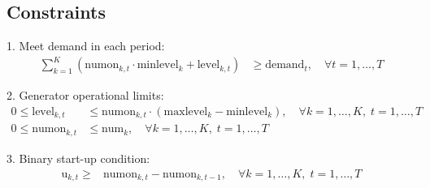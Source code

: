 \documentclass{article}
\begin{document}
\subsection*{Constraints}

1. Meet demand in each period:
\begin{align*}
\sum_{k=1}^{K} \left( \text{numon}_{k,t} \cdot \text{minlevel}_{k} + \text{level}_{k,t} \right) & \geq \text{demand}_{t}, \quad \forall t=1,\dots,T
\end{align*}

2. Generator operational limits:
\begin{align*}
0 \leq \text{level}_{k,t} & \leq \text{numon}_{k,t} \cdot (\text{maxlevel}_{k} - \text{minlevel}_{k}), \quad \forall k=1,\dots,K, \; t=1,\dots,T \\
0 \leq \text{numon}_{k,t} & \leq \text{num}_{k}, \quad \forall k=1,\dots,K, \; t=1,\dots,T
\end{align*}

3. Binary start-up condition:
\begin{align*}
\text{u}_{k,t} \geq & \text{numon}_{k,t} - \text{numon}_{k,t-1}, \quad \forall k=1,\dots,K, \; t=1,\dots,T
\end{align*}
\end{document}
